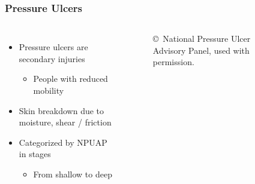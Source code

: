 		\begin{frame}
			\frametitle{Pressure Ulcers}
			\begin{columns}[c]
				\begin{itemize}
					\item Pressure ulcers are secondary injuries
					\begin{itemize}
						\item People with reduced mobility
					\end{itemize}

					\item Skin breakdown due to moisture, shear / friction

					\item Categorized by NPUAP in stages
					\begin{itemize}
						\item From shallow to deep
					\end{itemize}
				\end{itemize}

					\begin{figure}
						\centering



						\caption{\copyright\ National Pressure Ulcer Advisory Panel, used with permission.}
					\end{figure}
			\end{columns}
		\end{frame}